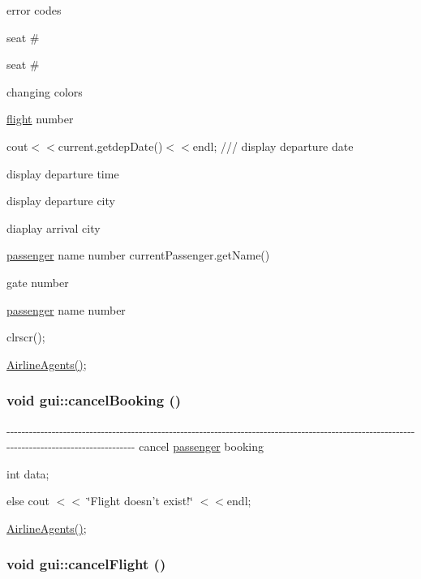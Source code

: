 error codes

seat \#

seat \#

changing colors

\hyperlink{classflight}{flight} number

cout$<$$<$current.getdepDate()$<$$<$endl; /// display departure date

display departure time

display departure city

diaplay arrival city

\hyperlink{classpassenger}{passenger} name number currentPassenger.getName()

gate number

\hyperlink{classpassenger}{passenger} name number

clrscr();

\hyperlink{classgui_ae39757d1c6bdbfa938dbe3226a36febb}{AirlineAgents()}; \hypertarget{classgui_ad8b14592f8959e7b1ff829722c182834}{
\subsubsection[{cancelBooking}]{\setlength{\rightskip}{0pt plus 5cm}void gui::cancelBooking ()}}
\label{classgui_ad8b14592f8959e7b1ff829722c182834}
-\/-\/-\/-\/-\/-\/-\/-\/-\/-\/-\/-\/-\/-\/-\/-\/-\/-\/-\/-\/-\/-\/-\/-\/-\/-\/-\/-\/-\/-\/-\/-\/-\/-\/-\/-\/-\/-\/-\/-\/-\/-\/-\/-\/-\/-\/-\/-\/-\/-\/-\/-\/-\/-\/-\/-\/-\/-\/-\/-\/-\/-\/-\/-\/-\/-\/-\/-\/-\/-\/-\/-\/-\/-\/-\/-\/-\/-\/-\/-\/-\/-\/-\/-\/-\/-\/-\/-\/-\/-\/-\/-\/-\/-\/-\/-\/-\/-\/-\/-\/-\/-\/-\/-\/-\/-\/-\/-\/-\/-\/-\/-\/-\/-\/-\/-\/-\/-\/-\/-\/-\/-\/-\/-\/-\/-\/-\/-\/-\/-\/-\/-\/-\/-\/-\/-\/-\/-\/-\/-\/-\/-\/ cancel \hyperlink{classpassenger}{passenger} booking 

int data;

else cout $<$$<$ \char`\"{}Flight doesn't exist!\char`\"{} $<$$<$endl;

\hyperlink{classgui_ae39757d1c6bdbfa938dbe3226a36febb}{AirlineAgents()}; \hypertarget{classgui_a819f4cfa292f74772159c562a56cd298}{
\subsubsection[{cancelFlight}]{\setlength{\rightskip}{0pt plus 5cm}void gui::cancelFlight ()}}
\label{classgui_a819f4cfa292f74772159c562a56cd298}


